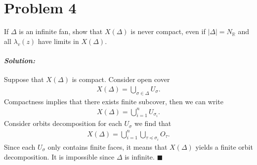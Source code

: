 \documentclass[12pt, a4paper]{article}
\newenvironment{solution}
  {\paragraph{\textit{Solution:}}\par\medskip}
  {\hfill$\blacksquare$\vspace{0.1cm}}
\begin{document}
\section*{Problem 4}

If $\Delta$ is an infinite fan, show that $X(\Delta)$ is never compact, even if $|\Delta| = N_{\mathbb{R}}$ and all $\lambda_v(z)$ have limits in $X(\Delta)$.

\begin{solution}
    Suppose that $X(\Delta)$ is compact. Consider open cover 
    \begin{align*}
        X(\Delta) = \bigcup_{\sigma\in \Delta} U_{\sigma}.
    \end{align*}
    Compactness implies that there exists finite subcover, then we can write 
    \begin{align*}
        X(\Delta) = \bigcup_{i=1}^n U_{\sigma_i}.
    \end{align*}
    Consider orbits decomposition for each $U_\sigma$ we find that 
    \begin{align*}
        X(\Delta) = \bigcup_{i=1}^n \bigcup_{\tau\preceq \sigma_i}O_{\tau}.
    \end{align*}
    Since each $U_{\sigma}$ only contains finite faces, it means that $X(\Delta)$ yields a finite orbit decomposition. 
    It is impossible since $\Delta$ is infinite.
\end{solution}
\end{document}
